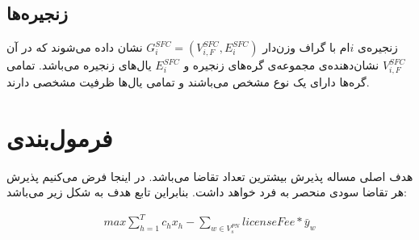 \subsection{زنجیره‌ها}
زنجیره‌‌ی \(i\)ام با گراف وزن‌دار
\(G^{SFC}_i = (V^{SFC}_{i, F}, E^{SFC}_i)\)
نشان داده می‌شوند
که در آن
\(V^{SFC}_{i, F}\)
نشان‌دهنده‌ی مجموعه‌ی گره‌های زنجیره
و
\(E^{SFC}_{i}\)
یال‌های زنجیره می‌باشد.
تمامی گره‌ها دارای یک نوع مشخص می‌باشند و تمامی یال‌ها ظرفیت مشخصی دارند.

\section{فرمول‌بندی}

هدف اصلی مساله پذیرش بیشترین تعداد تقاضا می‌باشد. در اینجا فرض می‌کنیم پذیرش هر تقاضا سودی منحصر به فرد خواهد داشت.
بنابراین تابع هدف به شکل زیر می‌باشد:

\begin{latin}\begin{align}
    max \sum_{h=1}^{T} c_hx_h - \sum_{w \in V_s^{PN}} licenseFee * \bar{y}_w
\end{align}\end{latin}

